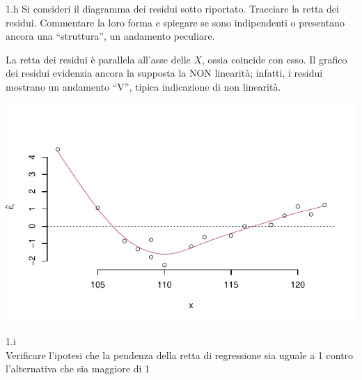 \documentclass[
  11pt,
]{book}
\theoremstyle{mytheoremstyle}
\theoremstyle{mydefstyle}
\newenvironment{sol}
  {
  \begin{tcolorbox}[enhanced,breakable,arc=0.1mm,boxrule=1pt,colback=white,colframe=iblue,
  title=\bf \fontfamily{lmss}\selectfont \hspace{.5 cm} Soluzione,drop fuzzy shadow]

}{
\end{tcolorbox}
  }
\begin{document}
1.h Si consideri il diagramma dei residui sotto riportato.
Tracciare la retta dei residui.
Commentare la loro forma e spiegare se sono indipendenti o presentano
ancora una ``struttura'', un andamento peculiare.

\begin{sol}

La retta dei residui è parallela all'asse delle \(X\), ossia coincide con esso.
Il grafico dei residui evidenzia ancora la supposta la NON linearità;
infatti, i residui mostrano un andamento ``V'', tipica indicazione di
non linearità.

\begin{center}\includegraphics{Esami_passati_con_soluzioni_files/figure-latex/06-regr-53-1} \end{center}

\end{sol}

1.i\\
Verificare
l'ipotesi che la pendenza della retta di regressione sia uguale a
1 contro l'alternativa che sia maggiore di 1
\end{document}
